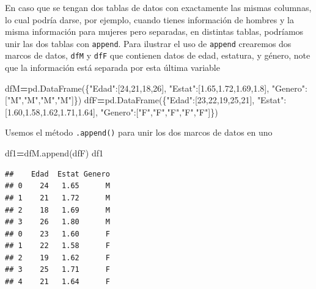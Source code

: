 \documentclass[
]{book}
\newenvironment{Shaded}{\begin{snugshade}}{\end{snugshade}}
\newcommand{\DecValTok}[1]{\textcolor[rgb]{0.00,0.00,0.81}{#1}}
\newcommand{\FloatTok}[1]{\textcolor[rgb]{0.00,0.00,0.81}{#1}}
\newcommand{\NormalTok}[1]{#1}
\newcommand{\OperatorTok}[1]{\textcolor[rgb]{0.81,0.36,0.00}{\textbf{#1}}}
\newcommand{\StringTok}[1]{\textcolor[rgb]{0.31,0.60,0.02}{#1}}
\theoremstyle{definition}
\theoremstyle{definition}
\theoremstyle{definition}
\theoremstyle{definition}
\theoremstyle{remark}
\begin{document}
En caso que se tengan dos tablas de datos con exactamente las mismas columnas, lo cual podría darse, por ejemplo, cuando tienes información de hombres y la misma información para mujeres pero separadas, en distintas tablas, podríamos unir las dos tablas con \texttt{append}. Para ilustrar el uso de \texttt{append} crearemos dos marcos de datos, \texttt{dfM} y \texttt{dfF} que contienen datos de edad, estatura, y género, note que la información está separada por esta última variable

\begin{Shaded}
\begin{Highlighting}[]
\NormalTok{dfM}\OperatorTok{=}\NormalTok{pd.DataFrame(\{}\StringTok{"Edad"}\NormalTok{:[}\DecValTok{24}\NormalTok{,}\DecValTok{21}\NormalTok{,}\DecValTok{18}\NormalTok{,}\DecValTok{26}\NormalTok{],}
     \StringTok{"Estat"}\NormalTok{:[}\FloatTok{1.65}\NormalTok{,}\FloatTok{1.72}\NormalTok{,}\FloatTok{1.69}\NormalTok{,}\FloatTok{1.8}\NormalTok{],}
     \StringTok{"Genero"}\NormalTok{:[}\StringTok{"M"}\NormalTok{,}\StringTok{"M"}\NormalTok{,}\StringTok{"M"}\NormalTok{,}\StringTok{"M"}\NormalTok{]\})}
\NormalTok{dfF}\OperatorTok{=}\NormalTok{pd.DataFrame(\{}\StringTok{"Edad"}\NormalTok{:[}\DecValTok{23}\NormalTok{,}\DecValTok{22}\NormalTok{,}\DecValTok{19}\NormalTok{,}\DecValTok{25}\NormalTok{,}\DecValTok{21}\NormalTok{],}
     \StringTok{"Estat"}\NormalTok{:[}\FloatTok{1.60}\NormalTok{,}\FloatTok{1.58}\NormalTok{,}\FloatTok{1.62}\NormalTok{,}\FloatTok{1.71}\NormalTok{,}\FloatTok{1.64}\NormalTok{],}
     \StringTok{"Genero"}\NormalTok{:[}\StringTok{"F"}\NormalTok{,}\StringTok{"F"}\NormalTok{,}\StringTok{"F"}\NormalTok{,}\StringTok{"F"}\NormalTok{,}\StringTok{"F"}\NormalTok{]\})}
\end{Highlighting}
\end{Shaded}

Usemos el método \texttt{.append()} para unir los dos marcos de datos en uno

\begin{Shaded}
\begin{Highlighting}[]
\NormalTok{df1}\OperatorTok{=}\NormalTok{dfM.append(dfF)}
\NormalTok{df1}
\end{Highlighting}
\end{Shaded}

\begin{verbatim}
##    Edad  Estat Genero
## 0    24   1.65      M
## 1    21   1.72      M
## 2    18   1.69      M
## 3    26   1.80      M
## 0    23   1.60      F
## 1    22   1.58      F
## 2    19   1.62      F
## 3    25   1.71      F
## 4    21   1.64      F
\end{verbatim}
\end{document}
